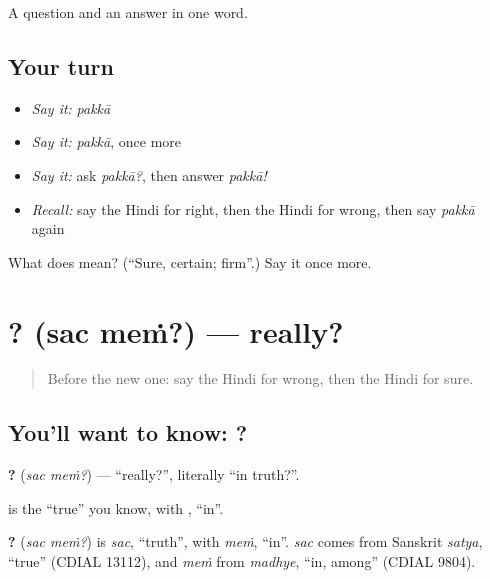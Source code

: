 \begin{grammarlens}[title={What you've built}]
A question and an answer in one word.
\end{grammarlens}

\subsection*{Your turn}
\begin{itemize}
\raggedright
  \item \emph{Say it:} \emph{pakkā}
  \item \emph{Say it:} \emph{pakkā}, once more
  \item \emph{Say it:} ask \emph{pakkā?}, then answer \emph{pakkā!}
  \item \emph{Recall:} say the Hindi for right, then the Hindi for wrong, then say \emph{pakkā} again
\end{itemize}

\begin{tcolorbox}[breakable,colback=teal!4,colframe=teal!35!black,title={Before you move on}]
What does  mean? (\textquotedblleft{}Sure, certain; firm\textquotedblright{}.) Say it once more.
\end{tcolorbox}
\section[\texorpdfstring{\hi{सच} \hi{में}? (sac meṁ?)}{सच में? (sac meṁ?)}]{ ? (sac meṁ?) — really?}

\label{lesson:HI-C112-sachme}



\begin{quote}
Before the new one: say the Hindi for wrong, then the Hindi for sure.
\end{quote}

\subsection*{You'll want to know:  ?}
\textbf{ ?} (\emph{sac meṁ?}) — \textquotedblleft{}really?\textquotedblright{}, literally \textquotedblleft{}in truth?\textquotedblright{}.

\textbf{} is the \textquotedblleft{}true\textquotedblright{} you know, with \textbf{}, \textquotedblleft{}in\textquotedblright{}.

\begin{cousinweb}
\textbf{ ?} (\emph{sac meṁ?}) is \emph{sac}, \textquotedblleft{}truth\textquotedblright{}, with \emph{meṁ}, \textquotedblleft{}in\textquotedblright{}. \emph{sac} comes from Sanskrit \emph{satya}, \textquotedblleft{}true\textquotedblright{} (CDIAL 13112), and \emph{meṁ} from \emph{madhye}, \textquotedblleft{}in, among\textquotedblright{} (CDIAL 9804).
\end{cousinweb}

